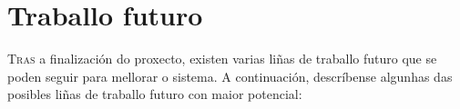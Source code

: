 \chapter{Traballo futuro}
\label{chap:Traballo futuro}

\lettrine{T}{ras} a finalización do proxecto, existen varias liñas de traballo futuro que se poden seguir para mellorar o sistema.
 A continuación, descríbense algunhas das posibles liñas de traballo futuro con maior potencial:
